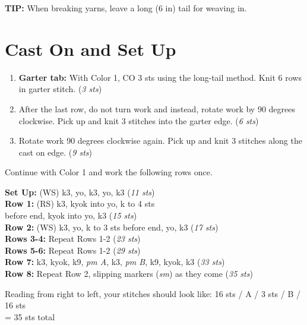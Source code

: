 \documentclass[12pt]{article}
\newcommand{\rowDir}[1]{\textbf{#1:}} %
\newcommand{\stitchcount}[1]{(\emph{#1 sts})}
\renewcommand{\pm}[1]{\emph{pm #1}} %
\newcommand{\sm}{\emph{sm}} %
\newenvironment{frnote}
    {%
    	\setlength{\FrameRule}{1.5pt}
    	\def\FrameCommand{\fboxrule=\FrameRule\fboxsep=\FrameSep \fcolorbox{framecolor}{shadecolor}}
    	\MakeFramed {\FrameRestore}}
    {\setlength{\FrameRule}{1pt}
	\endMakeFramed}
\newenvironment{unframed}
    {%
\begin{addmargin}[2em]{0pt}
	\setlength{\parindent}{-2em}}
    {\setlength{\parindent}{0em}
	\end{addmargin}}
\begin{document}
\begin{multicols}{2}
\begin{frnote}
\textbf{TIP:} When breaking yarns, leave a long (6 in) tail for weaving in.
\end{frnote}

\section*{Cast On and Set Up}

\begin{enumerate}
\item \textbf{Garter tab:} With Color 1, CO 3 sts \mbox{using} the long-tail method. Knit 6 rows in garter stitch. \stitchcount{3} 
\item \vspace{-.5em} After the last row, do not turn work and instead, rotate work by 90 degrees clockwise. Pick up and knit 3 stitches into the garter edge. \stitchcount{6}
\item \vspace{-.5em }Rotate work 90 degrees clockwise again. Pick up and knit 3 stitches along the cast on edge. \stitchcount{9}
\end{enumerate}

Continue with Color 1 and work the following rows once.

\begin{unframed}
\rowDir{Set Up} (WS) k3, yo, k3, yo, k3 \stitchcount{11} \\
\rowDir{Row 1} (RS) k3, kyok into yo, k to 4 sts \\ before end, kyok into yo, k3 \stitchcount{15} \\
\rowDir{Row 2} (WS) k3, yo, k to 3 sts before end, yo, k3 \stitchcount{17} \\
\rowDir{Rows 3-4} Repeat Rows 1-2 \stitchcount{23} \\
\rowDir{Rows 5-6} Repeat Rows 1-2 \stitchcount{29} \\
\rowDir{Row 7} k3, kyok, k9, \pm{A}, k3, \pm{B}, k9, kyok, k3 \stitchcount{33} \\
\rowDir{Row 8} Repeat Row 2, slipping markers (\sm) as they come \stitchcount{35}
\end{unframed}

Reading from right to left, your stitches should look like: 16 sts / A / 3 sts / B / 16 sts \\ = 35 sts total

\vfill


\end{multicols}
\end{document}
